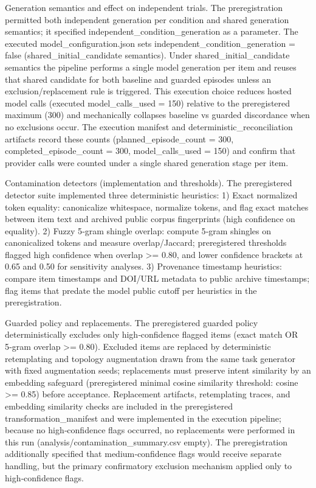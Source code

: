 \documentclass[conference]{IEEEtran}
\begin{document}
Generation semantics and effect on independent trials. The preregistration permitted both independent generation per condition and shared generation semantics; it specified independent\_condition\_generation as a parameter. The executed model\_configuration.json sets independent\_condition\_generation = false (shared\_initial\_candidate semantics). Under shared\_initial\_candidate semantics the pipeline performs a single model generation per item and reuses that shared candidate for both baseline and guarded episodes unless an exclusion/replacement rule is triggered. This execution choice reduces hosted model calls (executed model\_calls\_used = 150) relative to the preregistered maximum (300) and mechanically collapses baseline vs guarded discordance when no exclusions occur. The execution manifest and deterministic\_reconciliation artifacts record these counts (planned\_episode\_count = 300, completed\_episode\_count = 300, model\_calls\_used = 150) and confirm that provider calls were counted under a single shared generation stage per item.

Contamination detectors (implementation and thresholds). The preregistered detector suite implemented three deterministic heuristics:
1) Exact normalized token equality: canonicalize whitespace, normalize tokens, and flag exact matches between item text and archived public corpus fingerprints (high confidence on equality).
2) Fuzzy 5‑gram shingle overlap: compute 5‑gram shingles on canonicalized tokens and measure overlap/Jaccard; preregistered thresholds flagged high confidence when overlap >= 0.80, and lower confidence brackets at 0.65 and 0.50 for sensitivity analyses.
3) Provenance timestamp heuristics: compare item timestamps and DOI/URL metadata to public archive timestamps; flag items that predate the model public cutoff per heuristics in the preregistration.

Guarded policy and replacements. The preregistered guarded policy deterministically excludes only high‑confidence flagged items (exact match OR 5‑gram overlap >= 0.80). Excluded items are replaced by deterministic retemplating and topology augmentation drawn from the same task generator with fixed augmentation seeds; replacements must preserve intent similarity by an embedding safeguard (preregistered minimal cosine similarity threshold: cosine >= 0.85) before acceptance. Replacement artifacts, retemplating traces, and embedding similarity checks are included in the preregistered transformation\_manifest and were implemented in the execution pipeline; because no high‑confidence flags occurred, no replacements were performed in this run (analysis/contamination\_summary.csv empty). The preregistration additionally specified that medium‑confidence flags would receive separate handling, but the primary confirmatory exclusion mechanism applied only to high‑confidence flags.
\end{document}

